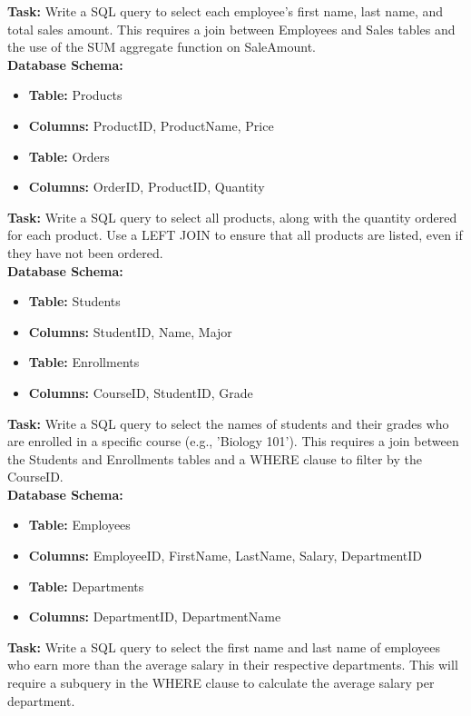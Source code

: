 \noindent \textbf{Task:} Write a SQL query to select each employee's first name, last name, and total sales amount. This requires a join between Employees and Sales tables and the use of the SUM aggregate function on SaleAmount.\\

\noindent \textbf{Database Schema:}
\begin{itemize}
    \item \textbf{Table:} Products
    \item \textbf{Columns:} ProductID, ProductName, Price
    \item \textbf{Table:} Orders
    \item \textbf{Columns:} OrderID, ProductID, Quantity
\end{itemize}

\noindent \textbf{Task:} Write a SQL query to select all products, along with the quantity ordered for each product. Use a LEFT JOIN to ensure that all products are listed, even if they have not been ordered.\\

\noindent \textbf{Database Schema:}
\begin{itemize}
    \item \textbf{Table:} Students
    \item \textbf{Columns:} StudentID, Name, Major
    \item \textbf{Table:} Enrollments
    \item \textbf{Columns:} CourseID, StudentID, Grade
\end{itemize}

\noindent \textbf{Task:} Write a SQL query to select the names of students and their grades who are enrolled in a specific course (e.g., 'Biology 101'). This requires a join between the Students and Enrollments tables and a WHERE clause to filter by the CourseID.\\

\noindent \textbf{Database Schema:} 
\begin{itemize}
    \item \textbf{Table:} Employees
    \item \textbf{Columns:} EmployeeID, FirstName, LastName, Salary, DepartmentID
    \item \textbf{Table:} Departments
    \item \textbf{Columns:} DepartmentID, DepartmentName
\end{itemize}

\noindent \textbf{Task:} Write a SQL query to select the first name and last name of employees who earn more than the average salary in their respective departments. This will require a subquery in the WHERE clause to calculate the average salary per department.\\

